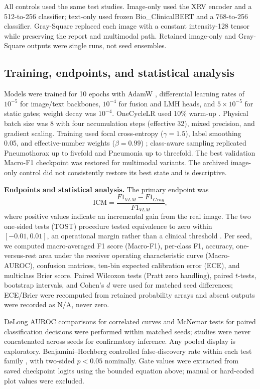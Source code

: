 All controls used the same test studies. Image-only used the XRV encoder and a
512-to-256 classifier; text-only used frozen Bio\_ClinicalBERT and a
768-to-256 classifier. Gray-Square replaced each image with a constant
intensity-128 tensor while preserving the report and multimodal path. Retained
image-only and Gray-Square outputs were single runs, not seed ensembles.

\subsection{Training, endpoints, and statistical analysis}\label{sec:training}
Models were trained for 10 epochs with AdamW \citep{loshchilov2019adamw}, differential learning rates of
$10^{-5}$ for image/text backbones, $10^{-4}$ for fusion and LMH heads, and
$5\times10^{-5}$ for static gates; weight decay was $10^{-4}$. OneCycleLR used
10\% warm-up \citep{smith2019superconvergence}. Physical batch size was 8 with four accumulation steps (effective
32), mixed precision, and gradient scaling. Training used focal
cross-entropy ($\gamma=1.5$), label smoothing 0.05, and effective-number
weights ($\beta=0.99$) \citep{lin2017focalloss}; class-aware sampling replicated
Pneumothorax up to fivefold and Pneumonia up to threefold. The best validation
Macro-F1 checkpoint was restored for multimodal variants. The archived
image-only control did not consistently restore its best state and is
descriptive.

\textbf{Endpoints and statistical analysis.}
The primary endpoint was
\begin{equation}
\mathrm{ICM}=\frac{F1_{VLM}-F1_{Gray}}{F1_{VLM}},
\end{equation}
where positive values indicate an incremental gain from the real image. The two
one-sided tests (TOST) procedure tested equivalence to zero within
$[-0.01,0.01]$, an operational margin rather
than a clinical threshold \citep{lakens2017equivalence}. Per seed, we computed
macro-averaged F1 score (Macro-F1), per-class F1, accuracy, one-versus-rest area under the receiver
operating characteristic curve (Macro-AUROC), confusion matrices, ten-bin
expected calibration error (ECE), and multiclass Brier score. Paired Wilcoxon tests
(Pratt zero handling), paired $t$-tests, bootstrap intervals, and Cohen’s $d$
were used for matched seed differences; ECE/Brier were recomputed from retained
probability arrays and absent outputs were recorded as N/A, never zero.

DeLong AUROC comparisons for correlated curves \citep{delong1988roc} and
McNemar tests for paired classification decisions \citep{mcnemar1947correlated}
were performed within matched seeds; studies were never concatenated across
seeds for confirmatory inference. Any pooled display is exploratory.
Benjamini--Hochberg controlled false-discovery rate within each test family
\citep{benjamini1995fdr}, with two-sided $p<0.05$ nominally. Gate values were
extracted from saved checkpoint logits using the bounded equation above; manual
or hard-coded plot values were excluded.

